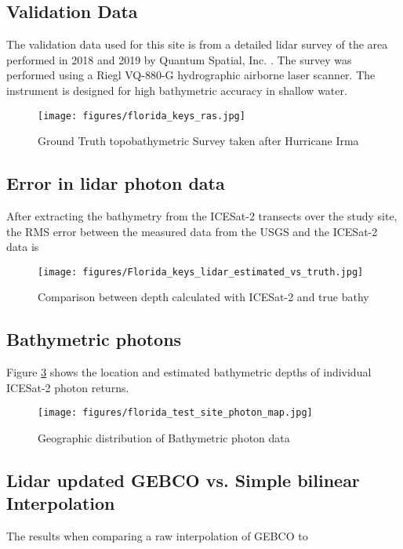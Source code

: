\subsection{Validation Data}
The validation data used for this site is from a detailed lidar survey of the area performed in 2018 and 2019 by Quantum Spatial, Inc. \parencite{Keys2019Lidar}. The survey was performed using a Riegl VQ-880-G hydrographic airborne laser scanner. The instrument is designed for high bathymetric accuracy in shallow water.
\begin{figure}[h!]
    \centering
    \texttt{[image: figures/florida\_keys\_ras.jpg]}
    \caption{Ground Truth topobathymetric Survey taken after Hurricane Irma}
    \label{fig:truebathy}
\end{figure}
\subsection{Error in lidar photon data}
After extracting the bathymetry from the ICESat-2 transects over the study site, the RMS error between the measured data from the USGS and the ICESat-2 data is
\begin{figure}[htbp]
    \centering
    \texttt{[image: figures/Florida\_keys\_lidar\_estimated\_vs\_truth.jpg]}
    \caption{Comparison between depth calculated with ICESat-2 and true bathy}
    \label{fig:fl_truth_vs_measured_points}
\end{figure}
% 

% 

\subsection{Bathymetric photons}
Figure \ref{fig:bathyphotonmap} shows the location and estimated bathymetric depths of individual ICESat-2 photon returns.
\begin{figure}[h!]
    \centering
    \texttt{[image: figures/florida\_test\_site\_photon\_map.jpg]}
    \caption{Geographic distribution of Bathymetric photon data}
    \label{fig:bathyphotonmap}
\end{figure}

\subsection{Lidar updated GEBCO vs. Simple bilinear Interpolation}
The results when comparing a raw interpolation of GEBCO to

\

